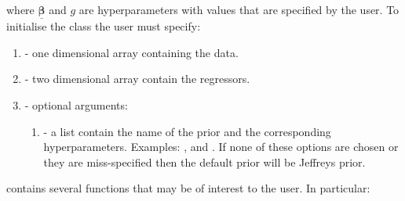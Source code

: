 \documentclass[article]{jss}
\begin{document}
where $\bm{\underline{\beta}}$ and $g$ are hyperparameters with
values that are specified by the user. To initialise the class 
the user must specify: 
\begin{enumerate}
\item {} - one dimensional  array containing the data. 
\item {} - two dimensional  array contain the regressors.
\item {} - optional arguments:

\begin{enumerate}
\item {} - a list contain the name of the prior and the
  corresponding hyperparameters. Examples: ,
  and . If none of these options
  are chosen or they are miss-specified then the default prior will be
  Jeffreys prior.
\end{enumerate}
\end{enumerate}
contains several functions that may be of interest
to the user. In particular: 
\end{document}
